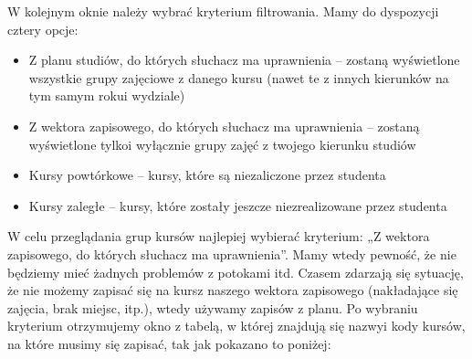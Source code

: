 \documentclass[11pt]{article}
\begin{document}
\indent \hspace{0.5cm} W kolejnym oknie należy wybrać kryterium filtrowania. Mamy do dyspozycji cztery opcje:
\begin{itemize}
    \item Z planu studiów, do których słuchacz ma uprawnienia – zostaną wyświetlone wszystkie grupy zajęciowe z danego kursu (nawet te z innych kierunków na tym samym roku\linebreak i wydziale)
    \item Z wektora zapisowego, do których słuchacz ma uprawnienia – zostaną wyświetlone tylko\linebreak i wyłącznie grupy zajęć z twojego kierunku studiów
    \item Kursy powtórkowe – kursy, które są niezaliczone przez studenta
    \item Kursy zaległe – kursy, które zostały jeszcze niezrealizowane przez studenta
\end{itemize}


\vspace{0.2cm}

\indent \hspace{0.5cm} W celu przeglądania grup kursów najlepiej wybierać kryterium: „Z wektora zapisowego, do których słuchacz ma uprawnienia”. Mamy wtedy pewność, że nie będziemy mieć żadnych problemów z potokami itd. Czasem zdarzają się sytuację, że nie możemy zapisać się na kurs\linebreak z naszego wektora zapisowego (nakładające się zajęcia, brak miejsc, itp.), wtedy używamy zapisów z planu. Po wybraniu kryterium otrzymujemy okno z tabelą, w której znajdują się nazwy\linebreak i kody kursów, na które musimy się zapisać, tak jak pokazano to poniżej:
\end{document}
